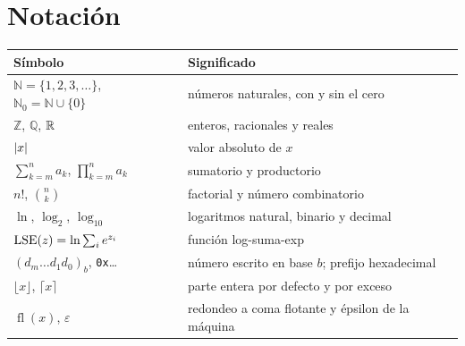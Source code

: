 \documentclass[11pt,a4paper,twoside,openany]{book}
\newcommand{\N}{\mathbb{N}}
\newcommand{\Z}{\mathbb{Z}}
\newcommand{\Q}{\mathbb{Q}}
\newcommand{\fl}{\operatorname{fl}}
\begin{document}
\section*{Notación}
\begin{center}
\begin{tabular}{@{}ll@{}}
\toprule
Símbolo & Significado \\
\midrule
$\N=\{1,2,3,\dots\}$, $\N_0=\N\cup\{0\}$ & números naturales, con y sin el cero \\
$\Z$, $\Q$, $\mathbb{R}$ & enteros, racionales y reales \\
$\lvert x\rvert$ & valor absoluto de $x$ \\
$\sum_{k=m}^{n}a_k$, $\prod_{k=m}^{n}a_k$ & sumatorio y productorio \\
$n!$, $\binom{n}{k}$ & factorial y número combinatorio \\
$\ln$, $\log_2$, $\log_{10}$ & logaritmos natural, binario y decimal \\
$\operatorname{LSE}(z)=\ln\sum_i e^{z_i}$ & función log-suma-exp \\
$(d_{m}\dots d_1d_0)_b$, \texttt{0x}\dots & número escrito en base $b$; prefijo hexadecimal \\
$\lfloor x\rfloor$, $\lceil x\rceil$ & parte entera por defecto y por exceso \\
$\fl(x)$, $\varepsilon$ & redondeo a coma flotante y épsilon de la máquina \\
\bottomrule
\end{tabular}
\end{center}

\tableofcontents

\mainmatter







\appendix


\backmatter

\end{document}
